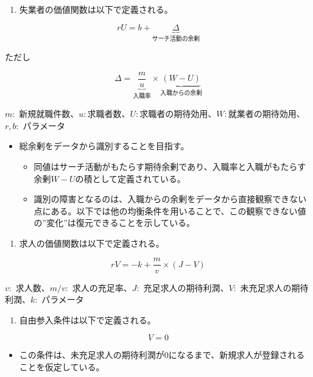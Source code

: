 \documentclass[
]{book}
\providecommand{\tightlist}{%
  \setlength{\itemsep}{0pt}\setlength{\parskip}{0pt}}
\begin{document}
\begin{enumerate}
\def\labelenumi{\arabic{enumi}.}
\tightlist
\item
  失業者の価値関数は以下で定義される。
\end{enumerate}

\[rU=b+\underbrace{\Delta}_{サーチ活動の余剰}\]

ただし

\[\Delta = \underbrace{\frac{m}{u}}_{入職率}\times \underbrace{(W-U)}_{入職からの余剰}\]

\(m:\) 新規就職件数、\(u:\)求職者数、\(U:\)求職者の期待効用、\(W:\)就業者の期待効用、\(r,b:\) パラメータ

\begin{itemize}
\item
  総余剰をデータから識別することを目指す。

  \begin{itemize}
  \item
    同値はサーチ活動がもたらす期待余剰であり、入職率と入職がもたらす余剰\(W-U\)の積として定義されている。
  \item
    識別の障害となるのは、入職からの余剰をデータから直接観察できない点にある。以下では他の均衡条件を用いることで、この観察できない値の''変化''は復元できることを示している。
  \end{itemize}
\end{itemize}

\begin{enumerate}
\def\labelenumi{\arabic{enumi}.}
\setcounter{enumi}{1}
\tightlist
\item
  求人の価値関数は以下で定義される。
\end{enumerate}

\[rV=-k+\frac{m}{v}\times (J-V)\]

\(v:\) 求人数、\(m/v:\) 求人の充足率、\(J:\) 充足求人の期待利潤、\(V:\) 未充足求人の期待利潤、\(k:\) パラメータ

\begin{enumerate}
\def\labelenumi{\arabic{enumi}.}
\setcounter{enumi}{2}
\tightlist
\item
  自由参入条件は以下で定義される。
\end{enumerate}

\[V=0\]

\begin{itemize}
\tightlist
\item
  この条件は、未充足求人の期待利潤が0になるまで、新規求人が登録されることを仮定している。
\end{itemize}
\end{document}
